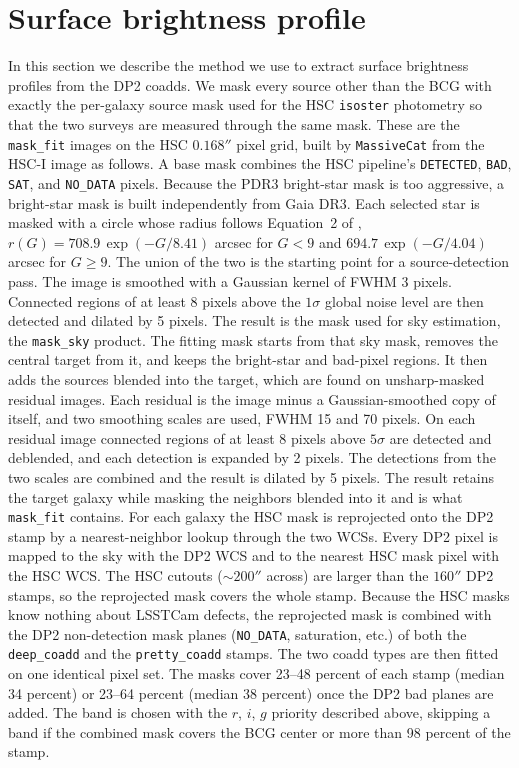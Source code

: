 \documentclass[SE,lsstdraft,authoryear,toc]{lsstdoc}
\begin{document}
\section{Surface brightness profile}
In this section we describe the method we use to extract surface brightness profiles from the DP2 coadds. We mask every source other than the BCG with exactly the per-galaxy source mask used for the HSC \texttt{isoster} photometry so that the two surveys are measured through the same mask. These are the \texttt{mask\_fit} images on the HSC $0.168''$ pixel grid, built by \texttt{MassiveCat} from the HSC-I image as follows. A base mask combines the HSC pipeline's \texttt{DETECTED}, \texttt{BAD}, \texttt{SAT}, and \texttt{NO\_DATA} pixels. Because the PDR3 bright-star mask is too aggressive, a bright-star mask is built independently from Gaia DR3. Each selected star is masked with a circle whose radius follows Equation~2 of \citet{2018PASJ...70S...7C}, $r(G) = 708.9\,\exp(-G/8.41)$ arcsec for $G < 9$ and $694.7\,\exp(-G/4.04)$ arcsec for $G \ge 9$. The union of the two is the starting point for a source-detection pass. The image is smoothed with a Gaussian kernel of FWHM 3 pixels. Connected regions of at least 8 pixels above the $1\sigma$ global noise level are then detected and dilated by 5 pixels. The result is the mask used for sky estimation, the \texttt{mask\_sky} product. The fitting mask starts from that sky mask, removes the central target from it, and keeps the bright-star and bad-pixel regions. It then adds the sources blended into the target, which are found on unsharp-masked residual images. Each residual is the image minus a Gaussian-smoothed copy of itself, and two smoothing scales are used, FWHM 15 and 70 pixels. On each residual image connected regions of at least 8 pixels above $5\sigma$ are detected and deblended, and each detection is expanded by 2 pixels. The detections from the two scales are combined and the result is dilated by 5 pixels. The result retains the target galaxy while masking the neighbors blended into it and is what \texttt{mask\_fit} contains. For each galaxy the HSC mask is reprojected onto the DP2 stamp by a nearest-neighbor lookup through the two WCSs. Every DP2 pixel is mapped to the sky with the DP2 WCS and to the nearest HSC mask pixel with the HSC WCS. The HSC cutouts ($\sim 200''$ across) are larger than the $160''$ DP2 stamps, so the reprojected mask covers the whole stamp. Because the HSC masks know nothing about LSSTCam defects, the reprojected mask is combined with the DP2 non-detection mask planes (\texttt{NO\_DATA}, saturation, etc.) of both the \texttt{deep\_coadd} and the \texttt{pretty\_coadd} stamps. The two coadd types are then fitted on one identical pixel set. The masks cover 23--48 percent of each stamp (median 34 percent) or 23--64 percent (median 38 percent) once the DP2 bad planes are added. The band is chosen with the $r$, $i$, $g$ priority described above, skipping a band if the combined mask covers the BCG center or more than 98 percent of the stamp.
\end{document}

